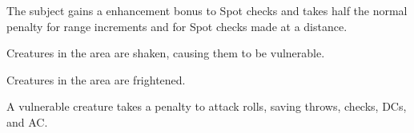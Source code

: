 \spellrng{\rngtouch}
\begin{spelleffect}
  The subject gains a  enhancement bonus to Spot checks and takes half the normal penalty for range increments and for Spot checks made at a distance. \bonusscalingdescription
\end{spelleffect}

\begin{spellhealthy}
  Creatures in the area are shaken, causing them to be vulnerable.
\end{spellhealthy}
\begin{spellblood}
  Creatures in the area are frightened.
\end{spellblood}
\begin{spellnotes}
  A vulnerable creature takes a  penalty to attack rolls, saving throws, checks, DCs, and AC.
\end{spellnotes}

